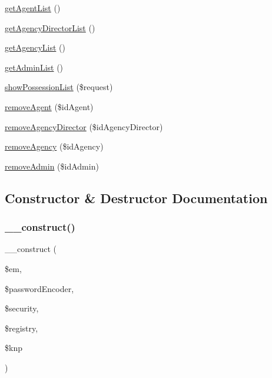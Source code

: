 \begin{DoxyCompactItemize}
\item 
\mbox{\hyperlink{class_app_1_1_controller_1_1_back_office_controller_a5cd69991d5f4d0002a9a8002367734a4}{get\+Agent\+List}} ()
\item 
\mbox{\hyperlink{class_app_1_1_controller_1_1_back_office_controller_aa6d737f94d498802b085cf08a7aadc86}{get\+Agency\+Director\+List}} ()
\item 
\mbox{\hyperlink{class_app_1_1_controller_1_1_back_office_controller_a15ba718fd7d047b203a9f0fde6849710}{get\+Agency\+List}} ()
\item 
\mbox{\hyperlink{class_app_1_1_controller_1_1_back_office_controller_a7c2e99709cd8777c15c7caa699fb6c54}{get\+Admin\+List}} ()
\item 
\mbox{\hyperlink{class_app_1_1_controller_1_1_back_office_controller_a56c2640063c53b8dde5edfc465887a6c}{show\+Possession\+List}} (\$request)
\item 
\mbox{\hyperlink{class_app_1_1_controller_1_1_back_office_controller_a6a57a8759329d23af8df40c5ec5494f4}{remove\+Agent}} (\$id\+Agent)
\item 
\mbox{\hyperlink{class_app_1_1_controller_1_1_back_office_controller_aab3676ef04d81d0f17434f67e61ece2f}{remove\+Agency\+Director}} (\$id\+Agency\+Director)
\item 
\mbox{\hyperlink{class_app_1_1_controller_1_1_back_office_controller_aaed7f556480a380f61b2a61cac7c83e9}{remove\+Agency}} (\$id\+Agency)
\item 
\mbox{\hyperlink{class_app_1_1_controller_1_1_back_office_controller_a4841ba151b489ed4738f598a597446cb}{remove\+Admin}} (\$id\+Admin)
\end{DoxyCompactItemize}


\subsection{Constructor \& Destructor Documentation}
\mbox{\label{class_app_1_1_controller_1_1_back_office_controller_a6d26388f23c19aa542ee973f05763cd3}} 
\subsubsection{\texorpdfstring{\_\_construct()}{\_\_construct()}}
{\footnotesize\ttfamily \+\_\+\+\_\+construct (\begin{DoxyParamCaption}\item[{Entity\+Manager\+Interface}]{\$em,  }\item[{User\+Password\+Encoder\+Interface}]{\$password\+Encoder,  }\item[{Security}]{\$security,  }\item[{Registry\+Interface}]{\$registry,  }\item[{Paginator\+Interface}]{\$knp }\end{DoxyParamCaption})}

